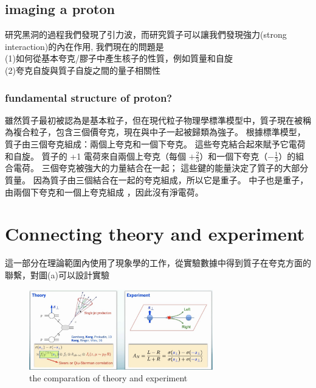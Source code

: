 \documentclass[12pt, a4paper, oneside]{ctexart}
\begin{document}
\begin{spacing}{2.0}
\subsection{imaging a proton}
研究黑洞的過程我們發現了引力波，而研究質子可以讓我們發現強力(strong interaction)的內在作用,
我們現在的問題是\\
(1)如何從基本夸克/膠子中產生核子的性質，例如質量和自旋\\
(2)夸克自旋與質子自旋之間的量子相關性
\subsubsection{fundamental structure of proton?}
雖然質子最初被認為是基本粒子，但在現代粒子物理學標準模型中，質子現在被稱為複合粒子，包含三個價夸克，現在與中子一起被歸類為強子。
根據標準模型，質子由三個夸克組成：兩個上夸克和一個下夸克。 這些夸克結合起來賦予它電荷和自旋。 
質子的 +1 電荷來自兩個上夸克（每個 $+\frac{2}{3}$）和一個下夸克（$-\frac{1}{3}$）的組合電荷。 三個夸克被強大的力量結合在一起； 
這些鍵的能量決定了質子的大部分質量。 因為質子由三個結合在一起的夸克組成，所以它是重子。 中子也是重子，由兩個下夸克和一個上夸克組成
，因此沒有淨電荷。

\section{Connecting theory and experiment}
這一部分在理論範圍內使用了現象學的工作，從實驗數據中得到質子在夸克方面的聯繫，對圖(a)可以設計實驗

\begin{figure}
    \centering
    \includegraphics[width=8cm]{theory and experiment.jpg}
    \caption{the comparation of theory and experiment}
\end{figure}



\end{spacing}
\end{document}
